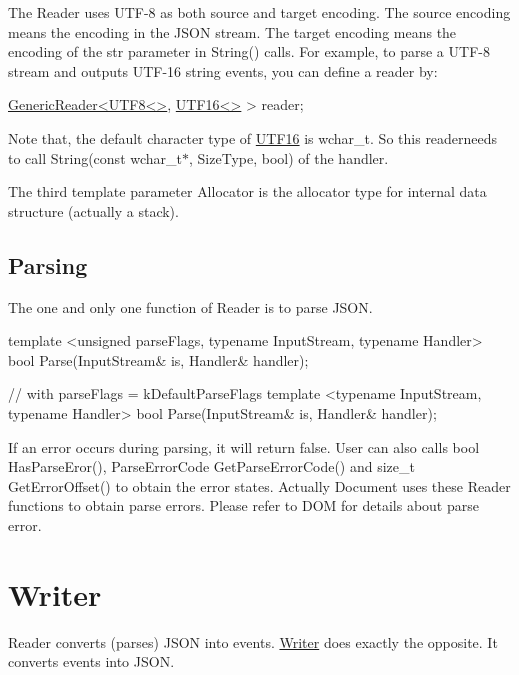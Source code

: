 The {\ttfamily Reader} uses U\+T\+F-\/8 as both source and target encoding. The source encoding means the encoding in the J\+S\+ON stream. The target encoding means the encoding of the {\ttfamily str} parameter in {\ttfamily String()} calls. For example, to parse a U\+T\+F-\/8 stream and outputs U\+T\+F-\/16 string events, you can define a reader by\+:


\begin{DoxyCode}
\hyperlink{class_generic_reader}{GenericReader<UTF8<>}, \hyperlink{struct_u_t_f16}{UTF16<>} > reader;
\end{DoxyCode}


Note that, the default character type of {\ttfamily \hyperlink{struct_u_t_f16}{U\+T\+F16}} is {\ttfamily wchar\+\_\+t}. So this {\ttfamily reader}needs to call {\ttfamily String(const wchar\+\_\+t$\ast$, Size\+Type, bool)} of the handler.

The third template parameter {\ttfamily Allocator} is the allocator type for internal data structure (actually a stack).\hypertarget{md_Cadriciel_Commun_Externe_RapidJSON_doc_sax.zh-cn_Parsing}{}\subsection{Parsing}\label{md_Cadriciel_Commun_Externe_RapidJSON_doc_sax.zh-cn_Parsing}
The one and only one function of {\ttfamily Reader} is to parse J\+S\+ON.


\begin{DoxyCode}
\textcolor{keyword}{template} <\textcolor{keywordtype}{unsigned} parseFlags, \textcolor{keyword}{typename} InputStream, \textcolor{keyword}{typename} Handler>
\textcolor{keywordtype}{bool} Parse(InputStream& is, Handler& handler);

\textcolor{comment}{// with parseFlags = kDefaultParseFlags}
\textcolor{keyword}{template} <\textcolor{keyword}{typename} InputStream, \textcolor{keyword}{typename} Handler>
\textcolor{keywordtype}{bool} Parse(InputStream& is, Handler& handler);
\end{DoxyCode}


If an error occurs during parsing, it will return {\ttfamily false}. User can also calls {\ttfamily bool Has\+Parse\+Eror()}, {\ttfamily Parse\+Error\+Code Get\+Parse\+Error\+Code()} and {\ttfamily size\+\_\+t Get\+Error\+Offset()} to obtain the error states. Actually {\ttfamily Document} uses these {\ttfamily Reader} functions to obtain parse errors. Please refer to D\+OM for details about parse error.\hypertarget{md_Cadriciel_Commun_Externe_RapidJSON_doc_sax.zh-cn_Writer}{}\section{Writer}\label{md_Cadriciel_Commun_Externe_RapidJSON_doc_sax.zh-cn_Writer}
{\ttfamily Reader} converts (parses) J\+S\+ON into events. {\ttfamily \hyperlink{class_writer}{Writer}} does exactly the opposite. It converts events into J\+S\+ON.

